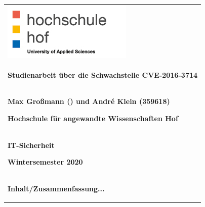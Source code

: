 \begin{center}
	\begin{tabular}{p{\textwidth}}

		\includegraphics[scale=0.75]{img/Logo.jpg}\\
		
		\begin{center}
			\textbf{Studienarbeit über die Schwachstelle CVE-2016-3714}
		\end{center}
		
		\\

		\begin{center}
			\textbf{Max Großmann () und André Klein (359618)}
		\end{center}
		\begin{center}
			\textbf{Hochschule für angewandte Wissenschaften Hof}
		\end{center}

		\\

		\begin{center}
			\textbf{IT-Sicherheit}
		\end{center}
		\begin{center}
			\textbf{Wintersemester 2020}
		\end{center}

		\\

		\begin{center}
			\textbf{Inhalt/Zusammenfassung...}
		\end{center}

	\end{tabular}
\end{center}
